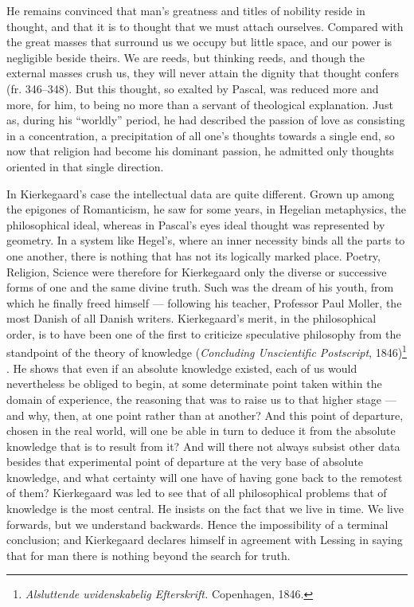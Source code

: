 \documentclass[12pt,a4paper]{article}
\newcommand{\dk}[1]{\foreignlanguage{danish}{#1}}
\newcommand{\opage}[1]{\marginnote{\footnotesize\textit{[#1]}}}
\begin{document}
He remains convinced that man's greatness and titles of nobility reside in
thought, and that it is to thought that we must attach ourselves. Compared with
the great masses that surround us we occupy but little space, and our power is
negligible beside theirs. We are reeds, but thinking reeds, and though the
external masses crush us, they will never attain the dignity that thought
confers (fr. 346--348). But this thought, so exalted by Pascal, was reduced more
and more, for him, to being no more than a servant of theological explanation.
Just as, during his ``worldly'' period, he had described the passion of love as
consisting in a concentration, a precipitation of all one's thoughts towards a
single end, so now that religion had become his dominant passion, he admitted
only thoughts oriented in that single direction.

In Kierkegaard's case the intellectual data are quite different. Grown up among
the epigones of Romanticism, he saw for some years, in Hegelian metaphysics,
the philosophical ideal, whereas in Pascal's eyes ideal thought was represented
by geometry. In a system like Hegel's, where an inner necessity binds all the
parts to one another, there is nothing that has not its logically marked place.
Poetry, Religion, Science were therefore for Kierkegaard only the diverse or
successive forms of one and the same divine truth. Such was the dream of his
youth, from which he finally freed himself --- following his teacher, Professor
Paul Moller,
the most Danish of all Danish writers. Kierkegaard's merit, in the philosophical
order, is to have been one of the first to criticize speculative philosophy from
the standpoint of the theory of knowledge (\emph{Concluding Unscientific
Postscript}, 1846)\footnote{\dk{\emph{Alsluttende uvidenskabelig Efterskrift.}}
Copenhagen, 1846.}%
.
He shows that even if an absolute knowledge existed, each of us would
nevertheless be obliged to begin, at some determinate point
\opage{233}taken within the domain of experience, the reasoning that was to raise us to
that higher stage --- and why, then, at one point rather than at another? And
this point of departure, chosen in the real world, will one be able in turn to
deduce it from the absolute knowledge that is to result from it? And will there
not always subsist other data besides that experimental point of departure at
the very base of absolute knowledge, and what certainty will one have of having
gone back to the remotest of them? Kierkegaard was led to see that of all
philosophical problems that of knowledge is the most central. He insists on the
fact that we live in time. We live forwards, but we understand backwards. Hence
the impossibility of a terminal conclusion; and Kierkegaard declares himself in
agreement with Lessing in saying that for man there is nothing beyond the search
for truth.
\end{document}
